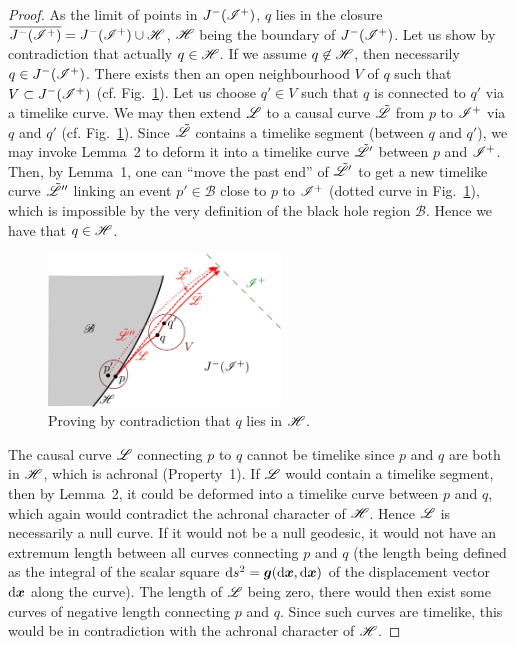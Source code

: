 \begin{proof}
As the limit of points in $J^-(\mathscr{I}^+)$, $q$ lies in the closure
$\overline{J^-(\mathscr{I}^+)} = J^-(\mathscr{I}^+) \cup \mathscr{H}$, $\mathscr{H}$
being the boundary of $J^-(\mathscr{I}^+)$.
Let us show by contradiction that actually $q\in\mathscr{H}$.
If we assume $q\not\in\mathscr{H}$, then necessarily $q\in J^-(\mathscr{I}^+)$.
There exists then an open neighbourhood $V$ of $q$ such that $V \subset  J^-(\mathscr{I}^+)$
(cf. Fig.~\ref{f:glo:q_in_H}).
Let us choose $q'\in V$ such that $q$ is connected to $q'$ via a timelike curve.
We may then extend $\mathscr{L}$ to a causal curve $\tilde{\mathscr{L}}$ from $p$ to $\mathscr{I}^+$
via $q$ and $q'$ (cf. Fig.~\ref{f:glo:q_in_H}). Since $\tilde{\mathscr{L}}$ contains a timelike segment
(between $q$ and $q'$), we may invoke Lemma~2 to deform it into
a timelike curve $\tilde{\mathscr{L}}'$ between $p$ and $\mathscr{I}^+$. Then, by Lemma~1,
one can ``move the past end'' of $\tilde{\mathscr{L}}'$
to get a new timelike curve $\tilde{\mathscr{L}}''$ linking an event $p'\in\mathscr{B}$ close
to $p$ to $\mathscr{I}^+$ (dotted curve in Fig.~\ref{f:glo:q_in_H}), which is impossible by the very definition of the black hole
region $\mathscr{B}$. Hence we have that $q\in\mathscr{H}$.

\begin{figure}
\centerline{\includegraphics[width=0.55\textwidth]{glo_q_in_H.pdf}}
\caption[]{\label{f:glo:q_in_H} \footnotesize
Proving by contradiction that $q$ lies in $\mathscr{H}$.}
\end{figure}


The causal curve $\mathscr{L}$ connecting $p$ to $q$ cannot be timelike since
$p$ and $q$ are both in $\mathscr{H}$, which is achronal (Property~1).
If $\mathscr{L}$ would contain a timelike segment, then by Lemma~2, it could
be deformed into a timelike curve between $p$ and $q$, which again would
contradict the achronal character of $\mathscr{H}$. Hence $\mathscr{L}$ is necessarily a null
curve. If it would not be a null geodesic, it would not have an extremum length
between all curves connecting $p$ and $q$ (the length being defined as
the integral of the scalar square $\mathrm{d} s^2 = \bm{g}(\mathrm{d}\bm{x}, \mathrm{d}\bm{x})$
of the displacement vector $\mathrm{d}\bm{x}$ along the curve).
The length of $\mathscr{L}$ being zero, there would then exist some curves of negative
length connecting $p$ and $q$. Since such curves are timelike, this
would be in contradiction with the achronal character of $\mathscr{H}$.


\end{proof}
